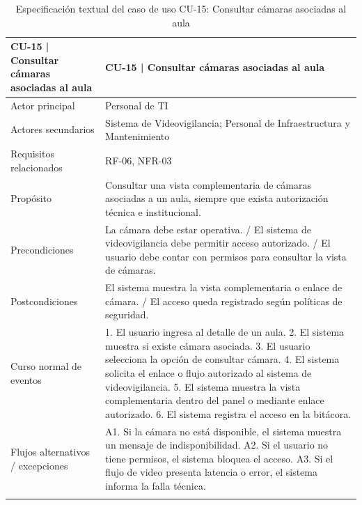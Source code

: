 \begingroup
\small
\begin{longtable}{|p{7.8cm}|p{7.8cm}|}
\hline
CU-15 | Consultar cámaras asociadas al aula & CU-15 | Consultar cámaras asociadas al aula \\ \hline
Actor principal & Personal de TI \\ \hline
Actores secundarios & Sistema de Videovigilancia; Personal de Infraestructura y Mantenimiento \\ \hline
Requisitos relacionados & RF-06, NFR-03 \\ \hline
Propósito & Consultar una vista complementaria de cámaras asociadas a un aula, siempre que exista autorización técnica e institucional. \\ \hline
Precondiciones & La cámara debe estar operativa. / El sistema de videovigilancia debe permitir acceso autorizado. / El usuario debe contar con permisos para consultar la vista de cámaras. \\ \hline
Postcondiciones & El sistema muestra la vista complementaria o enlace de cámara. / El acceso queda registrado según políticas de seguridad. \\ \hline
Curso normal de eventos & 1. El usuario ingresa al detalle de un aula. 2. El sistema muestra si existe cámara asociada. 3. El usuario selecciona la opción de consultar cámara. 4. El sistema solicita el enlace o flujo autorizado al sistema de videovigilancia. 5. El sistema muestra la vista complementaria dentro del panel o mediante enlace autorizado. 6. El sistema registra el acceso en la bitácora. \\ \hline
Flujos alternativos / excepciones & A1. Si la cámara no está disponible, el sistema muestra un mensaje de indisponibilidad. A2. Si el usuario no tiene permisos, el sistema bloquea el acceso. A3. Si el flujo de video presenta latencia o error, el sistema informa la falla técnica. \\ \hline
\caption{Especificación textual del caso de uso CU-15: Consultar cámaras asociadas al aula}
\end{longtable}
\endgroup

